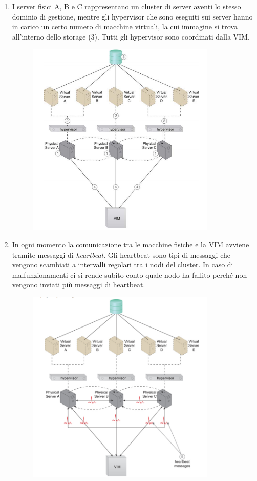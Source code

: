 \begin{enumerate}
    \item I server fisici A, B e C rappresentano un cluster di server aventi lo stesso dominio di gestione, mentre gli hypervisor che sono eseguiti sui server hanno in carico un certo numero di macchine virtuali, la cui immagine si trova all'interno dello storage (3). Tutti gli hypervisor sono coordinati dalla VIM.
    \clearpage
    
    \begin{figure}[htb!]
    \centering
    \includegraphics[width=9cm]{./Images/cap12/12.1.png}
    \end{figure}

    \item In ogni momento la comunicazione tra le macchine fisiche e la VIM avviene tramite messaggi di \textit{heartbeat}. Gli heartbeat sono tipi di messaggi che vengono scambiati a intervalli regolari tra i nodi del cluster. In caso di malfunzionamenti ci si rende subito conto quale nodo ha fallito perché non vengono inviati più messaggi di heartbeat.
    
    \begin{figure}[htb!]
    \centering
    \includegraphics[width=9cm]{./Images/cap12/12.2.png}
    \end{figure}


\end{enumerate}

